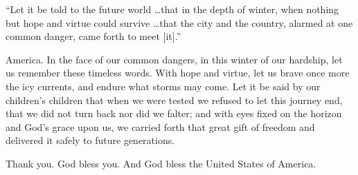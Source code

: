 \documentclass[12pt,a4paper,onecolumn]{article}
\begin{document}
\begin{sffamily}
``Let it be told to the future world \ldots that in the depth of winter, when nothing but hope and
virtue could survive \ldots that the city and the country, alarmed at one common danger, came forth
to meet $[$it$]$.''

America. In the face of our common dangers, in this winter of our hardship, let us remember these
timeless words. With hope and virtue, let us brave once more the icy currents, and endure what
storms may come. Let it be said by our children's children that when we were tested we refused to
let this journey end, that we did not turn back nor did we falter; and with eyes fixed on the
horizon and God's grace upon us, we carried forth that great gift of freedom and delivered it safely
to future generations.

Thank you. God bless you. And God bless the United States of America.

\end{sffamily}
\end{document}
